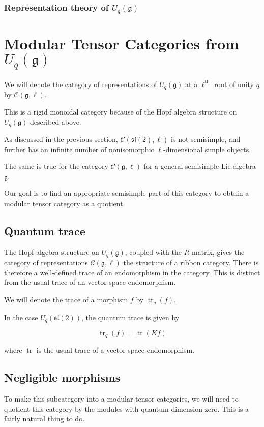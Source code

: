 \documentclass[]{article}
\newcommand{\tr}{\operatorname{tr}}
\newcommand{\sll}{\mathfrak{sl}}
\numberwithin{equation}{subsection}
\begin{document}
    \subsubsection{Representation theory of $U_q(\mathfrak{g})$}

\section{Modular Tensor Categories from $U_q(\mathfrak{g})$}
We will denote the category of representations of $U_q(\mathfrak{g})$ at a
$\ell^\text{th}$ root of unity $q$ by $\mathcal{C}(\mathfrak{g}, \ell)$. 

This is a rigid monoidal category because of the Hopf algebra structure on
$U_q(\mathfrak{g})$ described above. 

As discussed in the previous section, $\mathcal{C}(\sll(2),\ell)$ is not
semisimple, and further has an infinite number of nonisomorphic
$\ell$-dimensional simple objects.  

The same is true for the category $\mathcal{C}(\mathfrak{g}, \ell)$ for a
general semisimple Lie algebra $\mathfrak{g}$.

Our goal is to find an appropriate semisimple part of this category to obtain a
modular tensor category as a quotient.




\subsection{Quantum trace}

The Hopf algebra structure on $U_q(\mathfrak{g})$, coupled with the $R$-matrix,
gives the category of representations $\mathcal{C}(\mathfrak{g}, \ell)$ the
structure of a ribbon category. There is therefore a well-defined trace of an
endomorphism in the category. This is distinct from the usual trace of an
vector space endomorphism. 

We will denote the trace of a morphism $f$ by $\tr_q(f)$.

In the case $U_q(\sll(2))$, the quantum trace is given by 

\begin{equation}
    \tr_q(f) = \tr(Kf)
\end{equation}

where $\tr$ is the usual trace of a vector space endomorphism.

\subsection{Negligible morphisms}
To make this subcategory into a modular tensor categories, we will need to
quotient this category by the modules with quantum dimension zero. This is a
fairly natural thing to do.  %
\end{document}

